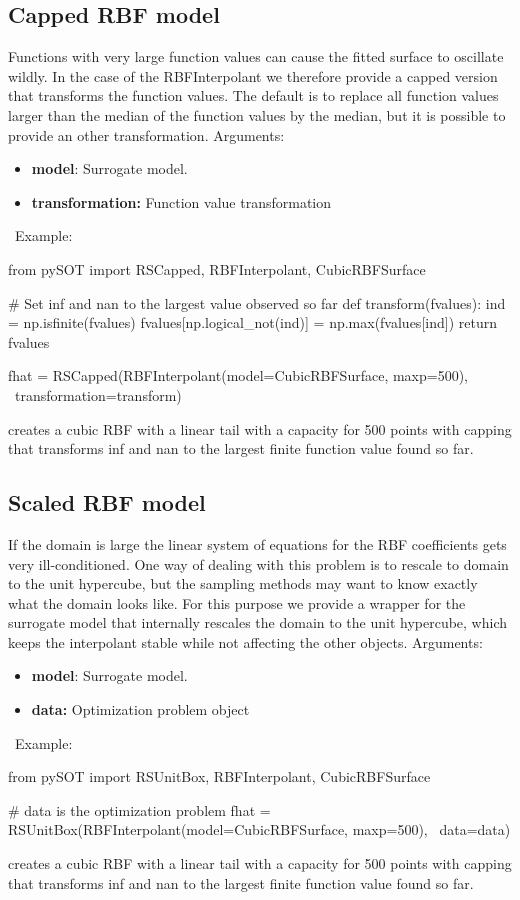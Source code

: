 \documentclass[]{article}
\begin{document}
\subsection{Capped RBF model} Functions with very large function values can cause the fitted surface to oscillate wildly. In the case of the RBFInterpolant we therefore provide a capped version that transforms the function values. The default is to replace all function values larger than the median of the function values by the median, but it is possible to provide an other transformation. Arguments: \\
\begin{itemize}
\item \textbf{model}: Surrogate model.
\item \textbf{transformation:} Function value transformation
\end{itemize}
\ \newline Example: 
\begin{python}
from pySOT import RSCapped, RBFInterpolant, CubicRBFSurface

# Set inf and nan to the largest value observed so far	          
def transform(fvalues):
	ind = np.isfinite(fvalues)
	fvalues[np.logical_not(ind)] = np.max(fvalues[ind])
	return fvalues
	
fhat = RSCapped(RBFInterpolant(model=CubicRBFSurface, maxp=500), \ 
		transformation=transform)
\end{python}
creates a cubic RBF with a linear tail with a capacity for 500 points with capping that transforms inf and nan to the largest finite function value found so far.

\subsection{Scaled RBF model} If the domain is large the linear system of equations for the RBF coefficients gets very ill-conditioned. One way of dealing with this problem is to rescale to domain to the unit hypercube, but the sampling methods may want to know exactly what the domain looks like. For this purpose we provide a wrapper for the surrogate model that internally rescales the domain to the unit hypercube, which keeps the interpolant stable while not affecting the other objects.  Arguments: \\
\begin{itemize}
\item \textbf{model}: Surrogate model.
\item \textbf{data:} Optimization problem object
\end{itemize}
\ \newline Example: 
\begin{python}
from pySOT import RSUnitBox, RBFInterpolant, CubicRBFSurface

# data is the optimization problem
fhat = RSUnitBox(RBFInterpolant(model=CubicRBFSurface, maxp=500), \ 
		data=data)
\end{python}
creates a cubic RBF with a linear tail with a capacity for 500 points with capping that transforms inf and nan to the largest finite function value found so far.
\end{document}
